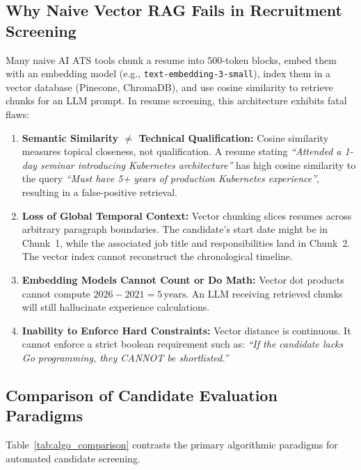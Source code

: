 \documentclass[11pt,a4paper]{report}
\begin{document}
\subsection{Why Naive Vector RAG Fails in Recruitment Screening}
Many naive AI ATS tools chunk a resume into 500-token blocks, embed them with an embedding model (e.g., \texttt{text-embedding-3-small}), index them in a vector database (Pinecone, ChromaDB), and use cosine similarity to retrieve chunks for an LLM prompt. In resume screening, this architecture exhibits fatal flaws:
\begin{enumerate}[label=\textbf{\arabic*.}]
    \item \textbf{Semantic Similarity $\neq$ Technical Qualification:} Cosine similarity measures topical closeness, not qualification. A resume stating \emph{``Attended a 1-day seminar introducing Kubernetes architecture''} has high cosine similarity to the query \emph{``Must have 5+ years of production Kubernetes experience''}, resulting in a false-positive retrieval.
    \item \textbf{Loss of Global Temporal Context:} Vector chunking slices resumes across arbitrary paragraph boundaries. The candidate's start date might be in Chunk~1, while the associated job title and responsibilities land in Chunk~2. The vector index cannot reconstruct the chronological timeline.
    \item \textbf{Embedding Models Cannot Count or Do Math:} Vector dot products cannot compute $2026 - 2021 = 5\,\text{years}$. An LLM receiving retrieved chunks will still hallucinate experience calculations.
    \item \textbf{Inability to Enforce Hard Constraints:} Vector distance is continuous. It cannot enforce a strict boolean requirement such as: \emph{``If the candidate lacks Go programming, they CANNOT be shortlisted.''}
\end{enumerate}

\subsection{Comparison of Candidate Evaluation Paradigms}
Table~\ref{tab:algo_comparison} contrasts the primary algorithmic paradigms for automated candidate screening.
\end{document}
